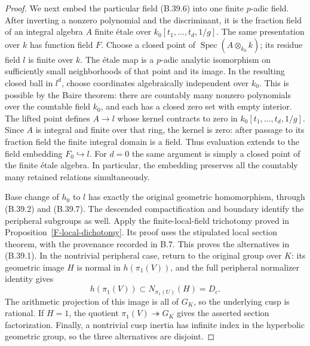 \begin{proof}
We next embed the particular field (B.39.6) into
one finite $p$-adic field. After inverting a
nonzero polynomial and the discriminant, it is
the fraction field of an integral algebra $A$
finite \'etale over
$k_0[t_1,\ldots,t_d,1/g]$. The same presentation
over $k$ has function field $F$. Choose a closed
point of $\operatorname{Spec}(A\otimes_{k_0}k)$;
its residue field $l$ is finite over $k$. The
\'etale map is a $p$-adic analytic isomorphism on
sufficiently small neighborhoods of that point
and its image. In the resulting closed ball
in $l^d$, choose coordinates algebraically
independent over $k_0$. This is possible by the
Baire theorem: there are countably many nonzero
polynomials over the countable field $k_0$, and
each has a closed zero set with empty interior.
The lifted point defines $A\to l$ whose kernel
contracts to zero in $k_0[t_1,\ldots,t_d,1/g]$.
Since $A$ is integral and finite over that ring,
the kernel is zero: after passage to its fraction
field the finite integral domain is a field.
Thus evaluation extends to the field embedding
$F_0\hookrightarrow l$. For $d=0$ the same
argument is simply a closed point of the finite
\'etale algebra. In particular, the embedding
preserves all the countably many retained
relations simultaneously.

Base change of $h_0$ to $l$ has exactly the original
geometric homomorphism, through (B.39.2) and
(B.39.7). The descended compactification and
boundary identify the peripheral subgroups as
well. Apply the finite-local-field trichotomy
proved in Proposition~\ref{F-local-dichotomy}.
Its proof uses the stipulated local section
theorem, with the provenance recorded in B.7.
This proves the alternatives in (B.39.1).
In the nontrivial peripheral case, return to
the original group over $K$: its geometric
image $H$ is normal in $h(\pi_1(V))$, and the
full peripheral normalizer identity gives
\[
 h(\pi_1(V))\subset
 N_{\pi_1(U)}(H)=D_c.
 \tag{B.39.8}
\]
The arithmetic projection of this image is all
of $G_K$, so the underlying cusp is rational.
If $H=1$, the quotient $\pi_1(V)\twoheadrightarrow
G_K$ gives the asserted section factorization.
Finally, a nontrivial cusp inertia has infinite
index in the hyperbolic geometric group, so
the three alternatives are disjoint.
\end{proof}

